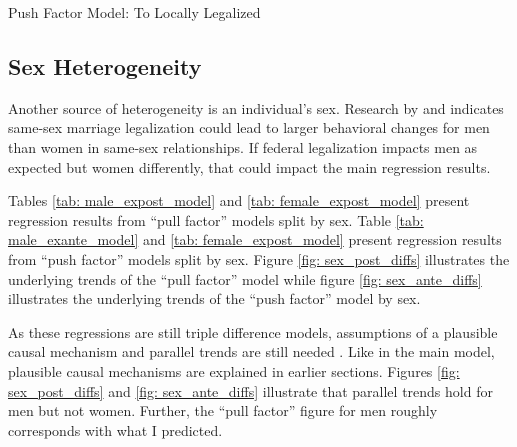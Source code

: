 \documentclass[12pt,letterpaper]{article}
\begin{document}
\begin{table}[p]
    \centering
    \caption{Push Factor Model: To Locally Legalized}
    \label{tab: tlocal_exante_model}
    
\end{table}


\clearpage
\subsection{Sex Heterogeneity}

Another source of heterogeneity is an individual’s sex. Research by \citet{1} and \citet{12} indicates same-sex marriage legalization could lead to larger behavioral changes for men than women in same-sex relationships. If federal legalization impacts men as expected but women differently, that could impact the main regression results.

Tables \ref{tab: male_expost_model} and \ref{tab: female_expost_model} present regression results from “pull factor” models split by sex. Table \ref{tab: male_exante_model} and \ref{tab: female_expost_model} present regression results from “push factor” models split by sex. Figure \ref{fig: sex_post_diffs} illustrates the underlying trends of the “pull factor” model while figure \ref{fig: sex_ante_diffs} illustrates the underlying trends of the “push factor” model by sex.

As these regressions are still triple difference models, assumptions of a plausible causal mechanism and parallel trends are still needed \citep{24, 25}. Like in the main model, plausible causal mechanisms are explained in earlier sections. Figures \ref{fig: sex_post_diffs} and \ref{fig: sex_ante_diffs} illustrate that parallel trends hold for men but not women. Further, the “pull factor” figure for men roughly corresponds with what I predicted.
\end{document}
